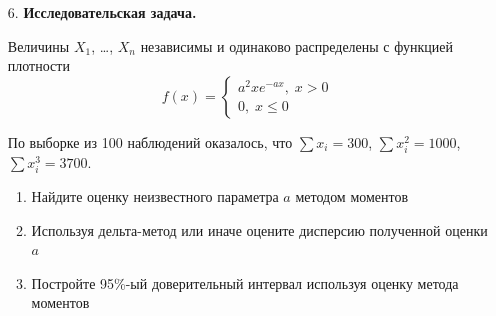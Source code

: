 \begin{enumerate}
\item[6.] \textbf{Исследовательская задача.}

Величины $X_1$, \ldots, $X_n$ независимы и одинаково распределены с функцией плотности
\[
f(x)=\begin{cases}
a^2xe^{-ax}, \; x>0 \\
0, \; x\leq 0
\end{cases}
\]

По выборке из 100 наблюдений оказалось, что $\sum x_i =300$, $\sum x_i^2=1000$,
$\sum x_i^3=3700$.

\begin{enumerate}
\item Найдите оценку неизвестного параметра $a$ методом моментов
\item Используя дельта-метод или иначе оцените дисперсию полученной оценки $a$
\item Постройте 95\%-ый доверительный интервал используя оценку метода моментов
\end{enumerate}
\end{enumerate}
